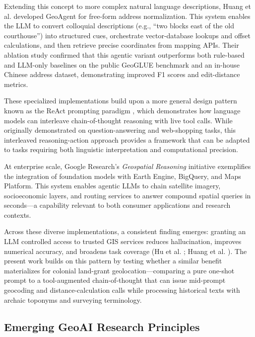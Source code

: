 Extending this concept to more complex natural language descriptions,
Huang et al. \citep{Huang2024_geoagent} developed GeoAgent for free-form
address normalization. This system enables the LLM to convert colloquial
descriptions (e.g., ``two blocks east of the old courthouse'') into
structured cues, orchestrate vector-database lookups and offset
calculations, and then retrieve precise coordinates from mapping APIs.
Their ablation study confirmed that this agentic variant outperforms
both rule-based and LLM-only baselines on the public GeoGLUE benchmark
and an in-house Chinese address dataset, demonstrating improved F1
scores and edit-distance metrics.

These specialized implementations build upon a more general design
pattern known as the ReAct prompting paradigm \citep{yao2023react},
which demonstrates how language models can interleave chain-of-thought
reasoning with live tool calls. While originally demonstrated on
question-answering and web-shopping tasks, this interleaved
reasoning-action approach provides a framework that can be adapted to
tasks requiring both linguistic interpretation and computational
precision.

At enterprise scale, Google Research's \emph{Geospatial Reasoning}
initiative \citep{GoogleResearch2025_geospatial} exemplifies the
integration of foundation models with Earth Engine, BigQuery, and Maps
Platform. This system enables agentic LLMs to chain satellite imagery,
socioeconomic layers, and routing services to answer compound spatial
queries in seconds---a capability relevant to both consumer applications
and research contexts.

Across these diverse implementations, a consistent finding emerges:
granting an LLM controlled access to trusted GIS services reduces
hallucination, improves numerical accuracy, and broadens task coverage
(Hu et al. \citep{Hu2024_toponym_llm}; Huang et al.
\citep{Huang2024_geoagent}). The present work builds on this pattern by
testing whether a similar benefit materializes for colonial land-grant
geolocation---comparing a pure one-shot prompt to a tool-augmented
chain-of-thought that can issue mid-prompt geocoding and
distance-calculation calls while processing historical texts with
archaic toponyms and surveying terminology.

\subsection{Emerging GeoAI Research
Principles}\label{emerging-geoai-research-principles}

